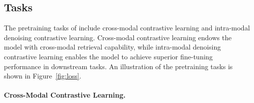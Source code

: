\subsection{Tasks}
The pretraining tasks of \onepeace include cross-modal contrastive learning and intra-modal denoising contrastive learning. 
Cross-modal contrastive learning endows the model with cross-modal retrieval capability, while intra-modal denoising contrastive learning enables the model to achieve superior fine-tuning performance in downstream tasks. 
An illustration of the pretraining tasks is shown in Figure~\ref{fig:loss}.

\paragraph{Cross-Modal Contrastive Learning.}




